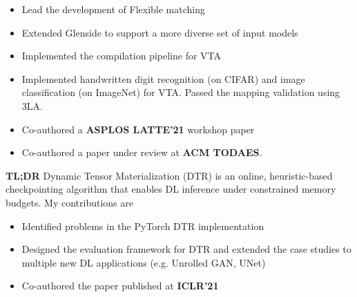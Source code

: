 \documentclass{resume}
\begin{document}
\begin{itemize}
    \item Lead the development of Flexible matching
    \item Extended Glenside to support a more diverse set of input models
    \item Implemented the compilation pipeline for VTA
    \item Implemented handwritten digit recognition (on CIFAR) and image classification (on ImageNet) for VTA. Passed the mapping validation using 3LA.
    \item Co-authored a \textbf{ASPLOS LATTE'21} workshop paper
    \item Co-authored a paper under review at \textbf{ACM TODAES}.
\end{itemize}
\textbf{TL;DR} Dynamic Tensor Materialization (DTR) is an online, heuristic-based checkpointing algorithm that enables DL inference under constrained memory budgets. My contributions are
\begin{itemize} 
    \item Identified problems in the PyTorch DTR implementation
    \item Designed the evaluation framework for DTR and extended the case studies to multiple new DL applications (e.g. Unrolled GAN, UNet)
    \item Co-authored the paper published at \textbf{ICLR'21}
\end{itemize}
\end{document}
